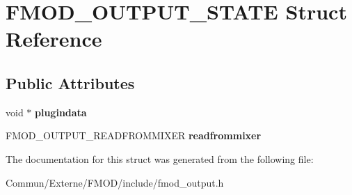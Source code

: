 \hypertarget{struct_f_m_o_d___o_u_t_p_u_t___s_t_a_t_e}{}\section{F\+M\+O\+D\+\_\+\+O\+U\+T\+P\+U\+T\+\_\+\+S\+T\+A\+TE Struct Reference}
\label{struct_f_m_o_d___o_u_t_p_u_t___s_t_a_t_e}
\subsection*{Public Attributes}
\begin{DoxyCompactItemize}
\item 
void $\ast$ {\bfseries plugindata}\hypertarget{struct_f_m_o_d___o_u_t_p_u_t___s_t_a_t_e_a08d52689c8b698c0ea363c7403e8978b}{}\label{struct_f_m_o_d___o_u_t_p_u_t___s_t_a_t_e_a08d52689c8b698c0ea363c7403e8978b}

\item 
F\+M\+O\+D\+\_\+\+O\+U\+T\+P\+U\+T\+\_\+\+R\+E\+A\+D\+F\+R\+O\+M\+M\+I\+X\+ER {\bfseries readfrommixer}\hypertarget{struct_f_m_o_d___o_u_t_p_u_t___s_t_a_t_e_a297cdb7fbba2150340cceecf8d4c9ca1}{}\label{struct_f_m_o_d___o_u_t_p_u_t___s_t_a_t_e_a297cdb7fbba2150340cceecf8d4c9ca1}

\end{DoxyCompactItemize}


The documentation for this struct was generated from the following file\+:\begin{DoxyCompactItemize}
\item 
Commun/\+Externe/\+F\+M\+O\+D/include/fmod\+\_\+output.\+h\end{DoxyCompactItemize}
